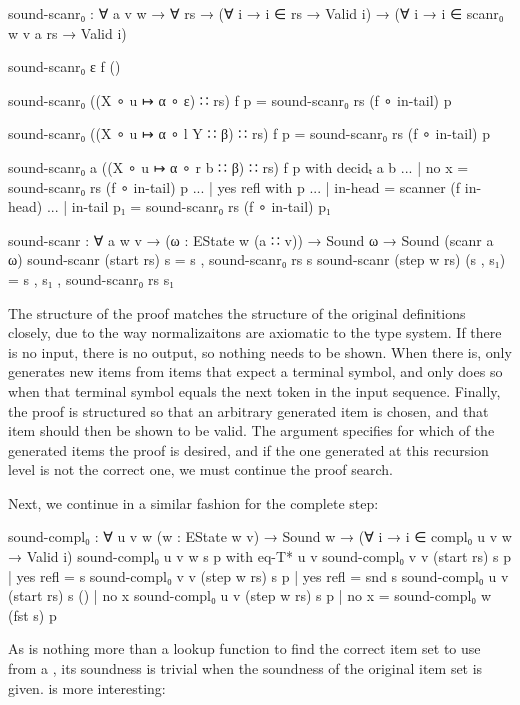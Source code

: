 		\begin{code}
			sound-scanr₀ : ∀ {a v w} → ∀ rs →
			  (∀ {i} → i ∈ rs → Valid i) →
			  (∀ {i} → i ∈ scanr₀ {w} {v} a rs → Valid i)

			sound-scanr₀ ε f ()

			sound-scanr₀ ((X ∘ u ↦ α ∘ ε) ∷ rs) f p =
			  sound-scanr₀ rs (f ∘ in-tail) p

			sound-scanr₀ ((X ∘ u ↦ α ∘ l Y ∷ β) ∷ rs) f p =
			  sound-scanr₀ rs (f ∘ in-tail) p

			sound-scanr₀ {a} ((X ∘ u ↦ α ∘ r b ∷ β) ∷ rs) f p with decidₜ a b
			... | no x = sound-scanr₀ rs (f ∘ in-tail) p
			... | yes refl with p
			...            | in-head    = scanner (f in-head)
			...            | in-tail p₁ = sound-scanr₀ rs (f ∘ in-tail) p₁

			sound-scanr : ∀ {a w v} → (ω : EState w (a ∷ v)) →
			  Sound ω → Sound (scanr a ω)
			sound-scanr (start rs) s = s , sound-scanr₀ rs s
			sound-scanr (step w rs) (s , s₁) = s , s₁ , sound-scanr₀ rs s₁
		\end{code}

		The structure of the proof matches the structure of the original
		definitions closely, due to the way normalizaitons are axiomatic to the
		type system. If there is no input, there is no output, so nothing needs
		to be shown. When there is,  only generates new items
		from items that expect a terminal symbol, and only does so when that
		terminal symbol equals the next token in the input sequence. Finally,
		the proof is structured so that an arbitrary generated item is chosen,
		and that item should then be shown to be valid. The argument 
		specifies for which of the generated items the proof is desired, and if
		the one generated at this recursion level is not the correct one, we
		must continue the proof search.

		Next, we continue in a similar fashion for the complete step:

		\begin{code}
			sound-compl₀ : ∀ {u v w} (w : EState w v) →
			  Sound w → (∀ {i} → i ∈ compl₀ {u} {v} w → Valid i)
			sound-compl₀ {u} {v} w s p           with eq-T* u v
			sound-compl₀ {v} {v} (start rs) s p  | yes refl = s
			sound-compl₀ {v} {v} (step w rs) s p | yes refl = snd s
			sound-compl₀ {u} {v} (start rs) s () | no x
			sound-compl₀ {u} {v} (step w rs) s p | no x = sound-compl₀ w (fst s) p
		\end{code}

		As  is nothing more than a lookup function to find
		the correct item set to use from a , its soundness is
		trivial when the soundness of the original item set is given.
		 is more interesting:

